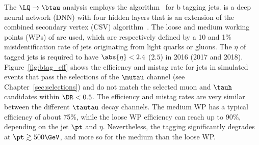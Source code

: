 The $\LQ\to\btau$ analysis employs the \DeepCSV algorithm~\cite{btag_deepCSV,btag_2018} for b tagging jets. \DeepCSV is a deep neural network (DNN) with four hidden layers that is an extension of the combined secondary vertex (CSV) algorithm~\cite{btag_deepCSV,btag_2018}.
The loose and medium working points (WPs) of \DeepCSV are used, which are respectively defined by a 10 and 1\% misidentification rate of jets originating from light quarks or gluons.
The $\eta$ of tagged jets is required to have $\abs{\eta}<2.4$ ($2.5$) in 2016 (2017 and 2018).
Figure~\ref{fig:btag_eff} shows the efficiency and mistag rate for jets in simulated events that pass the selections of the $\mutau$ channel (see Chapter~\ref{sec:selections}) and do not match the selected muon and $\tauh$ candidates within $\DR<0.5$. The efficiency and mistag rates are very similar between the different $\tautau$ decay channels.
The medium WP has a typical efficiency of about 75\%, while the loose WP efficiency can reach up to 90\%, depending on the jet $\pt$ and $\eta$. Nevertheless, the {\PQb} tagging significantly degrades at $\pt \gtrsim 500\GeV$, and more so for the medium than the loose WP.





